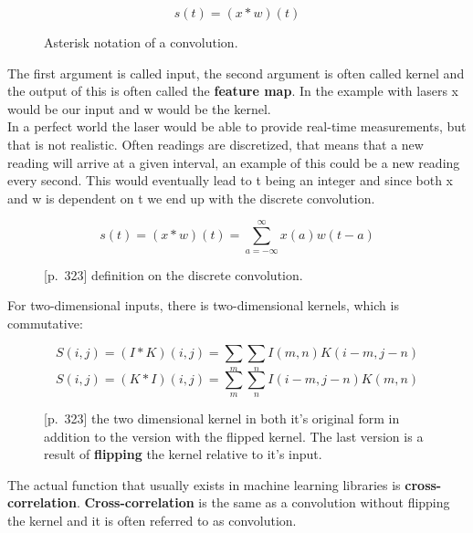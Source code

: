 \begin{figure}[H]
    \label{fig:conv_asterisk}
    \begin{equation}
        s(t) = (x*w)(t)
    \end{equation}
    \caption{Asterisk notation of a convolution.}
\end{figure}
The first argument is called input, the second argument is often called kernel and the output of this is often called the \textbf{feature map}. In the example with lasers x would be our input and w would be the kernel. %
\\
In a perfect world the laser would be able to provide real-time measurements, but that is not realistic. Often readings are discretized, that means that a new reading will arrive at a given interval, an example of this could be a new reading every second. This would eventually lead to t being an integer and since both x and w is dependent on t we end up with the discrete convolution. \parencite{goodfellow_deep_2016}
\begin{figure}[H]
    \label{fig:disc_conv}
    \begin{equation}
        s(t) = (x*w)(t) = \sum_{a=-\infty}^{\infty} x(a)w(t-a)
    \end{equation}
    \caption{\cite{goodfellow_deep_2016}[p.~323] definition on the discrete convolution.}
\end{figure}
For two-dimensional inputs, there is two-dimensional kernels, which is commutative:
\begin{figure}[H]
    \label{fig:disc_conv2d}
    \begin{equation}
        S(i,j) = (I*K)(i,j) = \sum_{m} \sum_{n} I(m,n)K(i-m,j-n)
    \end{equation}
    \begin{equation}
        S(i,j) = (K*I)(i,j) = \sum_{m} \sum_{n} I(i-m,j-n)K(m,n)
    \end{equation}
    \caption{\cite{goodfellow_deep_2016}[p.~323] the two dimensional kernel in both it's original form in addition to the version with the flipped kernel. The last version is a result of \textbf{flipping} the kernel relative to it's input.}
\end{figure}
The actual function that usually exists in machine learning libraries is \textbf{cross-correlation}. \textbf{Cross-correlation} is the same as a convolution without flipping the kernel and it is often referred to as convolution.
